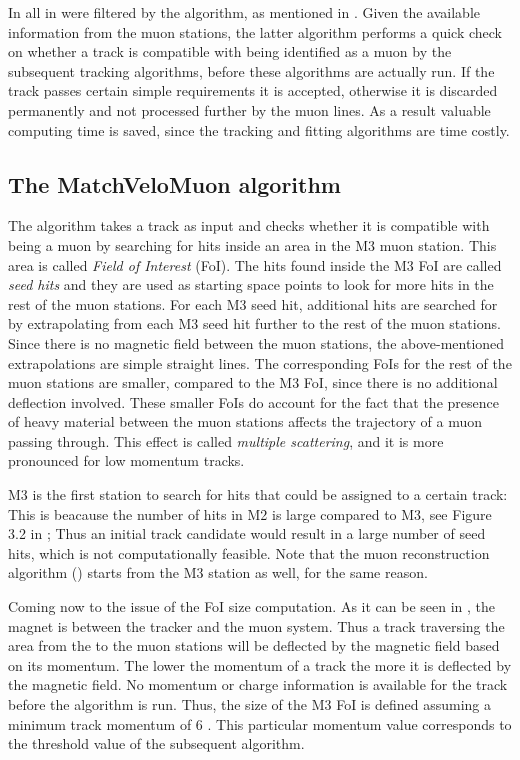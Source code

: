 In \runone all \veloTracks in \hltone were filtered by the \mvm algorithm, as mentioned in .
Given the available information from the muon stations, the latter algorithm performs a quick check on whether a
\velo track is compatible with being identified as a muon by the subsequent tracking algorithms, before these
algorithms are actually run. If the \velo track passes certain simple requirements it
is accepted, otherwise it is discarded permanently and not processed further by the \hlt muon lines. As a result
valuable computing time is saved, since the \FwD tracking and fitting algorithms are time costly.

\subsection{The MatchVeloMuon algorithm}
\label{sec:muon_matching}

The \mvm algorithm takes a \velo track as input and checks whether it is compatible with being a muon by
searching for hits inside an area in the M3 muon station. This area is called {\it Field of Interest} (FoI).
The hits found inside the M3 FoI are called {\it seed hits} and they are used as starting space points to look
for more hits in the rest of the muon stations. For each M3 seed hit, additional hits are searched for
by extrapolating from each M3 seed hit further to the rest of the muon stations.
Since there is no magnetic field between the muon stations, the above-mentioned extrapolations are simple straight lines.
The corresponding FoIs for the rest of the muon stations are smaller, compared to the M3 FoI, since there
is no additional deflection involved. These smaller FoIs do account for the fact that the presence of heavy material
between the muon stations affects the trajectory of a muon passing through. This effect is called {\it multiple
scattering}, and it is more pronounced for low momentum tracks.

M3 is the first station to search for hits that could be assigned to a certain \velo track: This is beacause the
number of hits in M2 is large compared to M3, see Figure 3.2 in \cite{roelThesis}; Thus an initial \velo track
candidate would result in a large number of seed hits, which is not computationally feasible. Note that the muon
reconstruction algorithm (\isMuon) starts from the M3 station as well, for the same reason.

Coming now to the issue of the FoI size computation. As it can be seen in ,
the \lhcb magnet is between the \velo tracker and the muon system. Thus a track traversing the area from the
\velo to the muon stations will be deflected by the magnetic field based on its momentum.  The lower the momentum
of a track the more it is deflected by the magnetic field. No momentum or charge information is available for
the \velo track before the \FwD algorithm is run. Thus, the size of the M3 FoI is defined assuming a minimum
track momentum of 6 \gevc. This particular momentum value corresponds to the threshold value of the subsequent
\isMuon algorithm.

